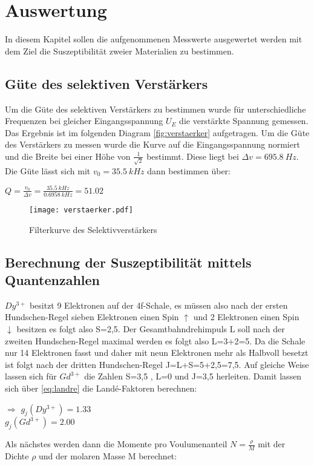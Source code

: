 \section{Auswertung}
\label{sec:auswertung}
In diesem Kapitel sollen die aufgenommenen Messwerte ausgewertet werden mit dem Ziel die Suszeptibilität 
zweier Materialien zu bestimmen.
\subsection{Güte des selektiven Verstärkers}
\label{sec:verstaerker}
Um die Güte des selektiven Verstärkers zu bestimmen wurde für unterschiedliche Frequenzen bei gleicher Eingangsspannung 
$U_E$ die verstärkte Spannung gemessen. Das Ergebnis ist im folgenden Diagram \autoref{fig:verstaerker} aufgetragen. 
Um die Güte des Verstärkers zu messen wurde die Kurve auf die Eingangsspannung normiert und die Breite
bei einer Höhe von $\frac{1}{\sqrt{2}}$ bestimmt. Diese liegt bei $\Delta v=\SI[]{695.8}[]{Hz}$. Die Güte lässt sich
mit $v_0=\SI[]{35.5}[]{kHz}$ dann bestimmen über:
\begin{center}
  $Q=\frac{v_0}{\Delta v}=\frac{\SI[]{35.5}[]{kHz}}{\SI[]{0.6958}[]{kHz}}=51.02$
\end{center}
\begin{figure}
    \centering
    \texttt{[image: verstaerker.pdf]}
    \caption{Filterkurve des Selektivverstärkers}
    \label{fig:verstaerker}
  \end{figure}
\newpage
\subsection{Berechnung der Suszeptibilität mittels Quantenzahlen}
\label{sec:quantenzahlen}
$Dy^{3+}$ besitzt 9 Elektronen auf der 4f-Schale, es müssen also nach der ersten Hundschen-Regel sieben 
Elektronen einen Spin $\uparrow$ und 2 Elektronen einen Spin $\downarrow$ besitzen es folgt also S=2,5.
Der Gesamtbahndrehimpuls L soll nach der zweiten Hundschen-Regel maximal werden es folgt also L=3+2=5.
Da die Schale nur 14 Elektronen fasst und daher mit neun Elektronen mehr als Halbvoll besetzt ist folgt 
nach der dritten Hundschen-Regel J=L+S=5+2,5=7,5.
Auf gleiche Weise lassen sich für $Gd^{3+}$ die Zahlen S=3,5 , L=0 und J=3,5 herleiten. 
Damit lassen sich über \autoref{eq:landre} die Landé-Faktoren berechnen:
\begin{center}
    $\Rightarrow$ $g_j(Dy^{3+})=1.33$\\
    $g_j(Gd^{3+})=2.00$
\end{center}
Als nächstes werden dann die Momente pro Voulumenanteil $N=\frac{\rho}{M}$ mit der Dichte $\rho$ und der
molaren Masse M berechnet:

